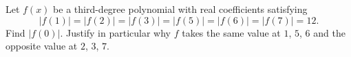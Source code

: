 Let $f(x)$ be a third-degree polynomial with real coefficients satisfying
\[
|f(1)|=|f(2)|=|f(3)|=|f(5)|=|f(6)|=|f(7)|=12 .
\]
Find $|f(0)|$. Justify in particular why $f$ takes the same value at $1$, $5$, $6$ and the opposite value at $2$, $3$, $7$.
